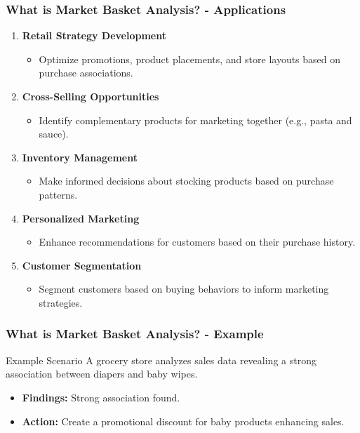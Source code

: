 \documentclass[aspectratio=169]{beamer}
\begin{document}
\begin{frame}[fragile]
    \frametitle{What is Market Basket Analysis? - Applications}
    \begin{enumerate}
        \item \textbf{Retail Strategy Development}
        \begin{itemize}
            \item Optimize promotions, product placements, and store layouts based on purchase associations.
        \end{itemize}
        
        \item \textbf{Cross-Selling Opportunities}
        \begin{itemize}
            \item Identify complementary products for marketing together (e.g., pasta and sauce).
        \end{itemize}
        
        \item \textbf{Inventory Management}
        \begin{itemize}
            \item Make informed decisions about stocking products based on purchase patterns.
        \end{itemize}
        
        \item \textbf{Personalized Marketing}
        \begin{itemize}
            \item Enhance recommendations for customers based on their purchase history.
        \end{itemize}
        
        \item \textbf{Customer Segmentation}
        \begin{itemize}
            \item Segment customers based on buying behaviors to inform marketing strategies.
        \end{itemize}
    \end{enumerate}
\end{frame}

\begin{frame}[fragile]
    \frametitle{What is Market Basket Analysis? - Example}
    \begin{block}{Example Scenario}
        A grocery store analyzes sales data revealing a strong association between diapers and baby wipes.
    \end{block}
    \begin{itemize}
        \item \textbf{Findings:} Strong association found.
        \item \textbf{Action:} Create a promotional discount for baby products enhancing sales.
    \end{itemize}
\end{frame}
\end{document}
